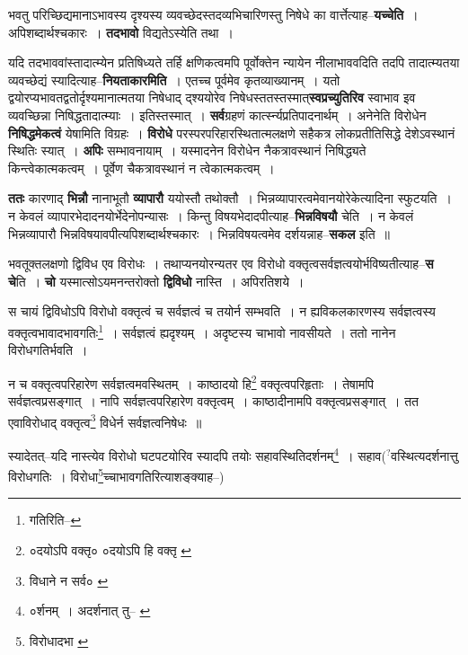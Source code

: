 \documentclass[article,12pt,a4paper]{memoir}
\newcommand{\unclear}[1]{($^{?}$#1)}
\begin{document}
	  \pstart भवतु परिच्छिद्यमानाऽभावस्य दृश्यस्य व्यवच्छेदस्तदव्यभिचारिणस्तु निषेधे का वार्त्तेत्याह--\textbf{यच्चेति} । अपिशब्दार्थश्चकारः । \textbf{तदभावो} विद्यतेऽस्येति तथा ।
	\pend
      

	  \pstart यदि तदभाववांस्तादात्म्येन प्रतिषिध्यते तर्हि क्षणिकत्वमपि पूर्वोक्तेन न्यायेन नीलाभाववदिति तदपि तादात्म्यतया व्यवच्छेद्यं स्यादित्याह--\textbf{नियताकारमिति} । एतच्च पूर्वमेव कृतव्याख्यानम् । यतो द्वयोरप्यभावतद्वतोर्दृश्यमानात्मतया निषेधाद् द्श्ययोरेव निषेधस्ततस्तस्मात्\textbf{स्वप्रच्युतिरिव} स्वाभाव इव व्यवच्छिन्ना निषिद्धतादात्म्याः । इतिस्तस्मात् । \textbf{सर्व}ग्रहणं कार्त्स्न्यप्रतिपादनार्थम् । अनेनेति विरोधेन \textbf{निषिद्धमेकत्वं} येषामिति विग्रहः । \textbf{विरोधे} परस्परपरिहारस्थितात्मलक्षणे सहैकत्र लोकप्रतीतिसिद्धे देशेऽवस्थानं स्थितिः स्यात् । \textbf{अपिः} सम्भावनायाम् । यस्मादनेन विरोधेन नैकत्रावस्थानं निषिद्ध्यते किन्त्वेकात्मकत्वम् । पूर्वेण चैकत्रावस्थानं न त्वेकात्मकत्वम् ।
	\pend
      

	  \pstart \textbf{ततः} कारणाद् \textbf{भिन्नौ} नानाभूतौ \textbf{व्यापारौ} ययोस्तौ तथोक्तौ । भिन्नव्यापारत्वमेवानयोरेकेत्यादिना स्फुटयति । न केवलं व्यापारभेदादनयोर्भेदेनोपन्यासः । किन्तु विषयभेदादपीत्याह--\textbf{भिन्नविषयौ} चेति । न केवलं भिन्नव्यापारौ भिन्नविषयावपीत्यपिशब्दार्थश्चकारः । भिन्नविषयत्वमेव दर्शयन्नाह--\textbf{सकल} इति ॥
	\pend
      

	  \pstart भवतूक्तलक्षणो द्विविध एव विरोधः । तथाप्यनयोरन्यतर एव विरोधो वक्तृत्वसर्वज्ञत्वयोर्भविष्यतीत्याह--\textbf{स चे}ति । \textbf{चो} यस्मात्सोऽयमनन्तरोक्तो \textbf{द्विविधो} नास्ति । अपिरतिशये ।
	\pend
	  \bigskip
	  \begingroup
	

	  \pstart स चायं द्विविधोऽपि विरोधो वक्तृत्वं च सर्वज्ञत्वं च तयोर्न सम्भवति । न ह्यविकलकारणस्य सर्वज्ञत्वस्य वक्तृत्वभावादभावगतिः\footnote{गतिरिति--\cite{dp-msD}} । सर्वज्ञत्वं ह्यदृश्यम् । अदृष्टस्य चाभावो नावसीयते । ततो नानेन विरोधगतिर्भवति ।
	\pend
       

	  \pstart न च वक्तृत्वपरिहारेण सर्वज्ञत्वमवस्थितम् । काष्ठादयो हि\footnote{०दयोऽपि वक्तृ० \cite{dp-msA} \cite{dp-msB} \cite{dp-edP} \cite{dp-edH} \cite{dp-edE} \cite{dp-edN} ०दयोऽपि हि वक्तृ \cite{dp-msC}} वक्तृत्वपरिहृताः । तेषामपि सर्वज्ञत्वप्रसङ्गात् । नापि सर्वज्ञत्वपरिहारेण वक्तृत्वम् । काष्ठादीनामपि वक्तृत्वप्रसङ्गात् । तत एवाविरोधाद् वक्तृत्व\footnote{विधाने न सर्व० \cite{dp-msA} \cite{dp-msB} \cite{dp-edP} \cite{dp-edH} \cite{dp-edE} \cite{dp-edN}} विधेर्न सर्वज्ञत्वनिषेधः ॥
	\pend
       

	  \pstart स्यादेतत्--यदि नास्त्येव विरोधो घटपटयोरिव स्यादपि तयोः सहावस्थितिदर्शनम्\footnote{०र्शनम् । अदर्शनात् तु--\cite{dp-msA} \cite{dp-msB} \cite{dp-msD} \cite{dp-edP} \cite{dp-edH} \cite{dp-edE} \cite{dp-edN}} । सहाव\unclear{वस्थित्यदर्शनात्तु विरोधगतिः । विरोधा\footnote{विरोधादभा \cite{dp-msB} \cite{dp-msD}}\-च्चाभावगतिरित्याशङ्क्याह--}
	\pend
      
\end{document}
